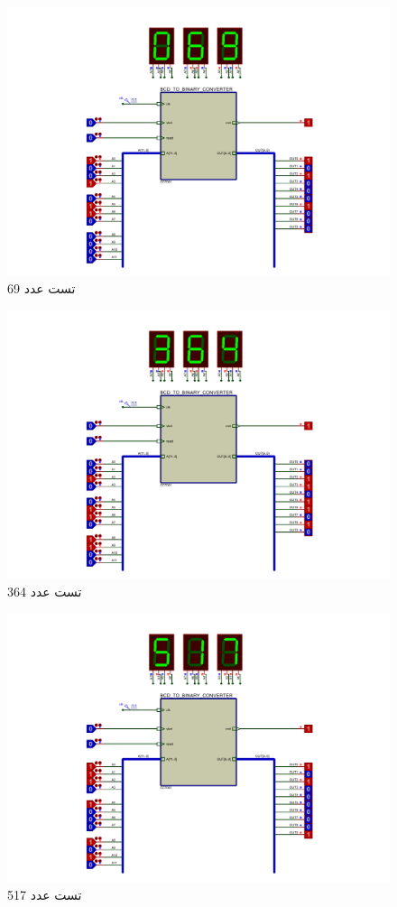 \documentclass{article}
\begin{document}
\begin{figure}
	\centering
	\includegraphics[scale=0.4]{./graphics/tests/69}
	\caption{تست عدد 69}
	\label{fig:69}
\end{figure}

\begin{figure}
	\centering
	\includegraphics[scale=0.4]{./graphics/tests/364}
	\caption{تست عدد 364}
	\label{fig:364}
\end{figure}

\begin{figure}
	\centering
	\includegraphics[scale=0.4]{./graphics/tests/517}
	\caption{تست عدد 517}
	\label{fig:517}
\end{figure}
\end{document}
